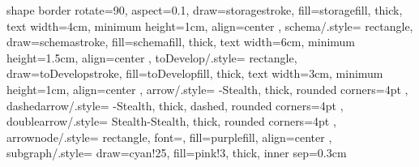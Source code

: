 {{        shape border rotate=90, aspect=0.1,
        draw=storagestroke, fill=storagefill,
        thick,
        text width=4cm,
        minimum height=1cm,
        align=center
    },
    schema/.style={
        rectangle,
        draw=schemastroke, fill=schemafill,
        thick,
        text width=6cm,
        minimum height=1.5cm,
        align=center
    },
    toDevelop/.style={
        rectangle,
        draw=toDevelopstroke, fill=toDevelopfill,
        thick,
        text width=3cm,
        minimum height=1cm,
        align=center
    },
    arrow/.style={
        -Stealth,
        thick,
        rounded corners=4pt
    },
    dashedarrow/.style={
        -Stealth,
        thick,
        dashed,
        rounded corners=4pt
    },
    doublearrow/.style={
        Stealth-Stealth,
        thick,
        rounded corners=4pt
    },
    arrownode/.style={
        rectangle,
        font=\sffamily\footnotesize,
        fill=purplefill,
        align=center
    },
    subgraph/.style={
        draw=cyan!25, fill=pink!3,
        thick,
        inner sep=0.3cm
    }
}